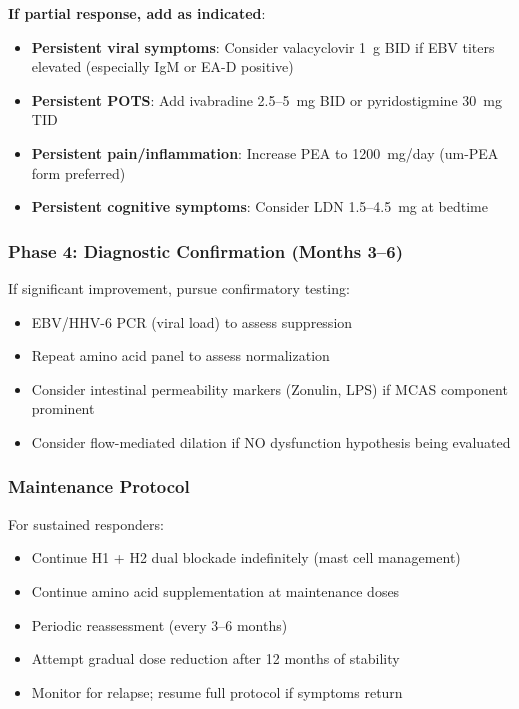 \textbf{If partial response, add as indicated}:
\begin{itemize}
    \item \textbf{Persistent viral symptoms}: Consider valacyclovir 1~g BID if EBV titers elevated (especially IgM or EA-D positive)
    \item \textbf{Persistent POTS}: Add ivabradine 2.5--5~mg BID or pyridostigmine 30~mg TID
    \item \textbf{Persistent pain/inflammation}: Increase PEA to 1200~mg/day (um-PEA form preferred)
    \item \textbf{Persistent cognitive symptoms}: Consider LDN 1.5--4.5~mg at bedtime
\end{itemize}

\subsubsection{Phase 4: Diagnostic Confirmation (Months 3--6)}

If significant improvement, pursue confirmatory testing:
\begin{itemize}
    \item EBV/HHV-6 PCR (viral load) to assess suppression
    \item Repeat amino acid panel to assess normalization
    \item Consider intestinal permeability markers (Zonulin, LPS) if MCAS component prominent
    \item Consider flow-mediated dilation if NO dysfunction hypothesis being evaluated
\end{itemize}

\subsubsection{Maintenance Protocol}

For sustained responders:
\begin{itemize}
    \item Continue H1 + H2 dual blockade indefinitely (mast cell management)
    \item Continue amino acid supplementation at maintenance doses
    \item Periodic reassessment (every 3--6 months)
    \item Attempt gradual dose reduction after 12 months of stability
    \item Monitor for relapse; resume full protocol if symptoms return
\end{itemize}

